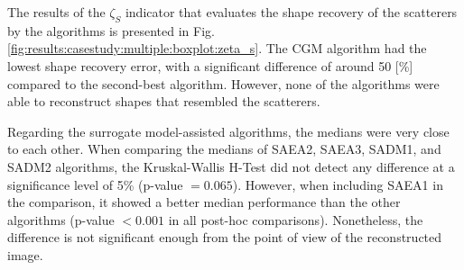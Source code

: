 			
			The results of the $\zeta_S$ indicator that evaluates the shape recovery of the scatterers by the algorithms is presented in Fig. \ref{fig:results:casestudy:multiple:boxplot:zeta_s}. The CGM algorithm had the lowest shape recovery error, with a significant difference of around 50 [\%] compared to the second-best algorithm. However, none of the algorithms were able to reconstruct shapes that resembled the scatterers.
			
			Regarding the surrogate model-assisted algorithms, the medians were very close to each other. When comparing the medians of SAEA2, SAEA3, SADM1, and SADM2 algorithms, the Kruskal-Wallis H-Test did not detect any difference at a significance level of 5\% (p-value $= 0.065$). However, when including SAEA1 in the comparison, it showed a better median performance than the other algorithms (p-value $< 0.001$ in all post-hoc comparisons). Nonetheless, the difference is not significant enough from the point of view of the reconstructed image.
			
